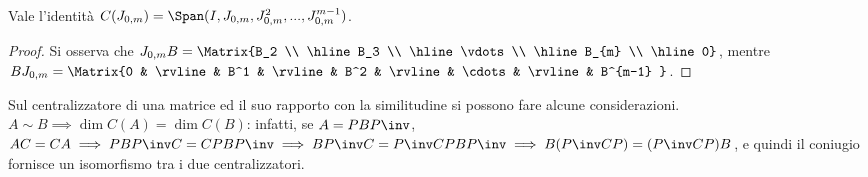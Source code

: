\documentclass[11pt]{article}
\begin{document}
	\begin{proposition}
		Vale l'identità $C(J_{0, m}) = \Span(I, J_{0, m}, J_{0, m}^2, ..., J_{0, m}^{m-1})$.
	\end{proposition}

	\begin{proof}
		Si osserva che $J_{0,m} B = \Matrix{B_2 \\ \hline B_3 \\ \hline \vdots \\ \hline B_{m} \\ \hline 0}$, mentre $B J_{0,m} = \Matrix{0 & \rvline & B^1 & \rvline & B^2 & \rvline & \cdots & \rvline & B^{m-1} }$.
	\end{proof}

	\begin{remark}
		Sul centralizzatore di una matrice ed il suo rapporto con la
		similitudine si possono fare alcune considerazioni. \\
		
		\li $A \sim B \implies \dim C(A) = \dim C(B)$: infatti, se
		$A = PBP\inv$, $AC = CA \implies PBP\inv C = C PBP\inv \implies
		BP\inv C=P\inv C P B P\inv \implies B (P\inv C P) = (P\inv C P) B$,
		e quindi il coniugio fornisce un isomorfismo tra i due
		centralizzatori.
	\end{remark}
	
\end{document}
